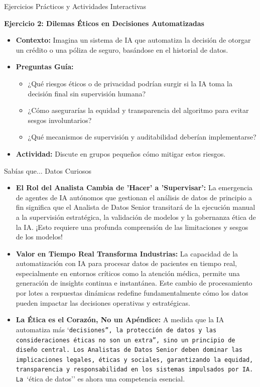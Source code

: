 \documentclass[aspectratio=169]{beamer}
\begin{document}
\begin{frame}{Ejercicios Prácticos y Actividades Interactivas}

\textbf{Ejercicio 2: Dilemas Éticos en Decisiones Automatizadas}
\begin{itemize}
  \item \textbf{Contexto:} Imagina un sistema de IA que automatiza la decisión de otorgar un crédito o una póliza de seguro, basándose en el historial de datos.
  \item \textbf{Preguntas Guía:}
  \begin{itemize}
    \item ¿Qué riesgos éticos o de privacidad podrían surgir si la IA toma la decisión final sin supervisión humana?
    \item ¿Cómo asegurarías la equidad y transparencia del algoritmo para evitar sesgos involuntarios?
    \item ¿Qué mecanismos de supervisión y auditabilidad deberían implementarse?
  \end{itemize}
  \item \textbf{Actividad:} Discute en grupos pequeños cómo mitigar estos riesgos.
\end{itemize}
\end{frame}

\begin{frame}{Sabías que... Datos Curiosos}

\begin{itemize}
  \item \textbf{El Rol del Analista Cambia de 'Hacer' a 'Supervisar':} La emergencia de agentes de IA autónomos que gestionan el análisis de datos de principio a fin significa que el Analista de Datos Senior transitará de la ejecución manual a la supervisión estratégica, la validación de modelos y la gobernanza ética de la IA. ¡Esto requiere una profunda comprensión de las limitaciones y sesgos de los modelos!
  \item \textbf{Valor en Tiempo Real Transforma Industrias:} La capacidad de la automatización con IA para procesar datos de pacientes en tiempo real, especialmente en entornos críticos como la atención médica, permite una generación de insights continua e instantánea. Este cambio de procesamiento por lotes a respuestas dinámicas redefine fundamentalmente cómo los datos pueden impactar las decisiones operativas y estratégicas.
  \item \textbf{La Ética es el Corazón, No un Apéndice:} A medida que la IA automatiza más `\texttt{decisiones'', la protección de datos y las consideraciones éticas no son un }\texttt{extra'', sino un principio de diseño central. Los Analistas de Datos Senior deben dominar las implicaciones legales, éticas y sociales, garantizando la equidad, transparencia y responsabilidad en los sistemas impulsados por IA. La }`ética de datos'' es ahora una competencia esencial.
\end{itemize}
\end{frame}
\end{document}
